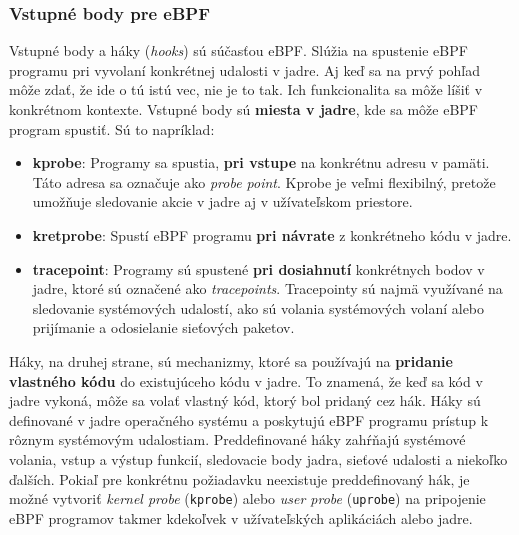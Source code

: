 \subsubsection{Vstupné body pre eBPF}
\label{sec:hooks}
Vstupné body a háky (\emph{hooks}) sú súčasťou eBPF. Slúžia na spustenie eBPF programu pri vyvolaní konkrétnej udalosti v jadre. 
Aj keď sa na prvý pohľad môže zdať, že ide o tú istú vec, nie je to tak. Ich funkcionalita sa môže líšiť v konkrétnom kontexte. 
Vstupné body sú \textbf{miesta v jadre}, kde sa môže eBPF program spustiť. Sú to napríklad:
\begin{itemize}
    \item \textbf{kprobe}: Programy sa spustia, \textbf{pri vstupe} na konkrétnu adresu v pamäti. 
    Táto adresa sa označuje ako \emph{probe point}. Kprobe je veľmi flexibilný, pretože umožňuje 
    sledovanie akcie v jadre aj v užívateľskom priestore.
    \item \textbf{kretprobe}: Spustí eBPF programu \textbf{pri návrate} z konkrétneho kódu v jadre.
    \item \textbf{tracepoint}: Programy sú spustené \textbf{pri dosiahnutí} konkrétnych bodov v jadre, 
    ktoré sú označené ako \emph{tracepoints}. Tracepointy sú najmä využívané na sledovanie systémových 
    udalostí, ako sú volania systémových volaní alebo prijímanie a odosielanie sieťových paketov.
\end{itemize}
Háky, na druhej strane, sú mechanizmy, ktoré sa používajú na \textbf{pridanie vlastného kódu} do existujúceho kódu v jadre. 
To znamená, že keď sa kód v jadre vykoná, môže sa volať vlastný kód, ktorý bol pridaný cez hák. Háky sú definované v 
jadre operačného systému a poskytujú eBPF programu prístup k rôznym systémovým udalostiam. Preddefinované háky zahŕňajú 
systémové volania, vstup a výstup funkcií, sledovacie body jadra, sieťové udalosti a niekoľko ďalších. Pokiaľ pre konkrétnu 
požiadavku neexistuje preddefinovaný hák, je možné vytvoriť \emph{kernel probe} (\texttt{kprobe}) alebo \emph{user probe} (\texttt{uprobe}) 
na pripojenie eBPF programov takmer kdekoľvek v užívateľských aplikáciách alebo jadre.


